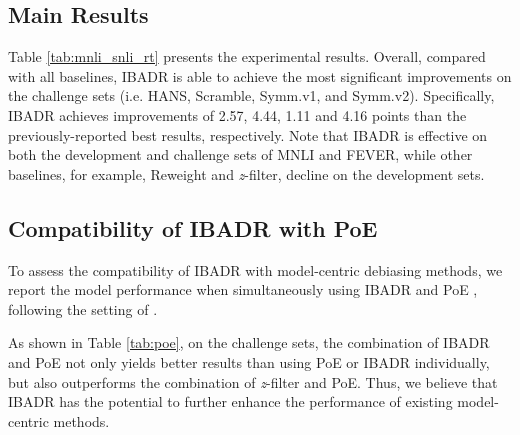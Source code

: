 \documentclass[11pt]{article}
\def\model{\textsc{IBADR}\xspace}
\begin{document}


\subsection{Main Results}

Table \ref{tab:mnli_snli_rt} presents the experimental results. Overall, compared with all %
baselines, \model is able to achieve the most significant improvements on the challenge sets (i.e. HANS, Scramble, Symm.v1, and Symm.v2). Specifically, IBADR achieves improvements of 2.57, 4.44, 1.11 and 4.16 points than the previously-reported best results, respectively.
Note that \model is effective on both the development and challenge sets of MNLI and FEVER, while other baselines, for example, Reweight and \textit{z}-filter, decline on the development sets. 

\subsection{Compatibility of \model with PoE} 
To assess the compatibility of \model with model-centric debiasing methods, we report the model performance when simultaneously using \model and PoE \cite{HeZW19_POE}, following the setting of \citet{wu2022generating}.

As shown in Table \ref{tab:poe}, on the challenge sets, the combination of \model and PoE not only yields better results than using PoE or IBADR individually, but also outperforms the combination of \textit{z}-filter and PoE. 
Thus, we believe that \model has the potential to further enhance the performance of existing model-centric methods.
\end{document}
